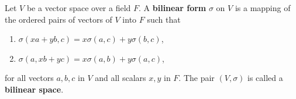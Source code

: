 Let $V$ be a vector space over a field $F$. A \textbf{bilinear form} $\sigma$ on $V$ is a mapping of the ordered pairs of vectors of $V$ into $F$ such that

\begin{enumerate}
\item $\sigma(xa + yb, c) = x\sigma(a, c) + y\sigma(b, c)$,
\item $\sigma(a, xb + yc) = x\sigma(a, b) + y\sigma(a, c)$,
\end{enumerate}

for all vectors $a, b, c$ in $V$ and all scalars $x, y$ in $F$. The pair $(V, \sigma)$ is called a \textbf{bilinear space}.
